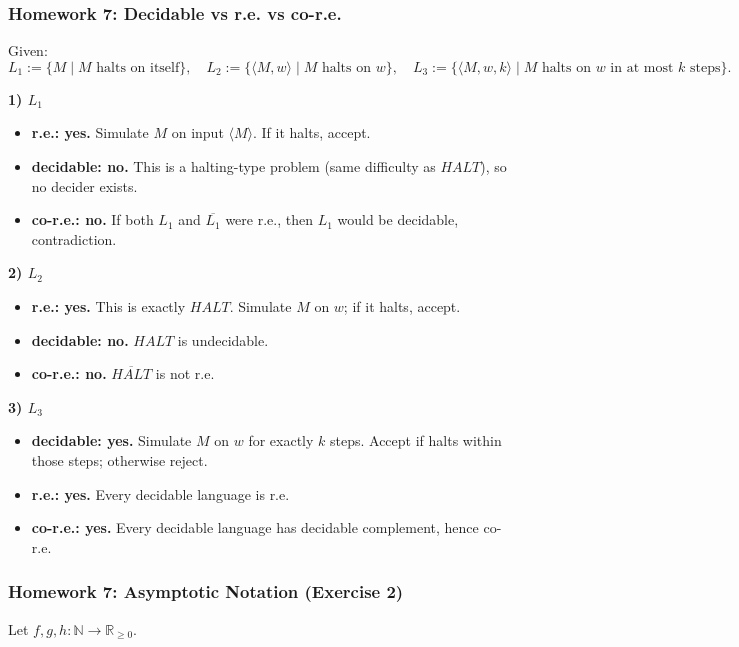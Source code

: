 \documentclass{article}
\theoremstyle{theorem}
\theoremstyle{definition}
\theoremstyle{remark}
\begin{document}
\subsubsection{Homework 7: Decidable vs r.e. vs co-r.e.}

Given:
\[
L_1:=\{M\mid M \text{ halts on itself}\},\quad
L_2:=\{\langle M,w\rangle\mid M \text{ halts on } w\},\quad
L_3:=\{\langle M,w,k\rangle\mid M \text{ halts on } w \text{ in at most } k \text{ steps}\}.
\]

\textbf{1) $L_1$}
\begin{itemize}
  \item \textbf{r.e.: yes.} Simulate $M$ on input $\langle M\rangle$. If it halts, accept.
  \item \textbf{decidable: no.} This is a halting-type problem (same difficulty as $HALT$), so no decider exists.
  \item \textbf{co-r.e.: no.} If both $L_1$ and $\overline{L_1}$ were r.e., then $L_1$ would be decidable, contradiction.
\end{itemize}

\textbf{2) $L_2$}
\begin{itemize}
  \item \textbf{r.e.: yes.} This is exactly $HALT$. Simulate $M$ on $w$; if it halts, accept.
  \item \textbf{decidable: no.} $HALT$ is undecidable.
  \item \textbf{co-r.e.: no.} $\overline{HALT}$ is not r.e.
\end{itemize}

\textbf{3) $L_3$}
\begin{itemize}
  \item \textbf{decidable: yes.} Simulate $M$ on $w$ for exactly $k$ steps. Accept if halts within those steps; otherwise reject.
  \item \textbf{r.e.: yes.} Every decidable language is r.e.
  \item \textbf{co-r.e.: yes.} Every decidable language has decidable complement, hence co-r.e.
\end{itemize}

\subsubsection{Homework 7: Asymptotic Notation (Exercise 2)}

Let $f,g,h:\mathbb{N}\to\mathbb{R}_{\ge 0}$.
\end{document}
